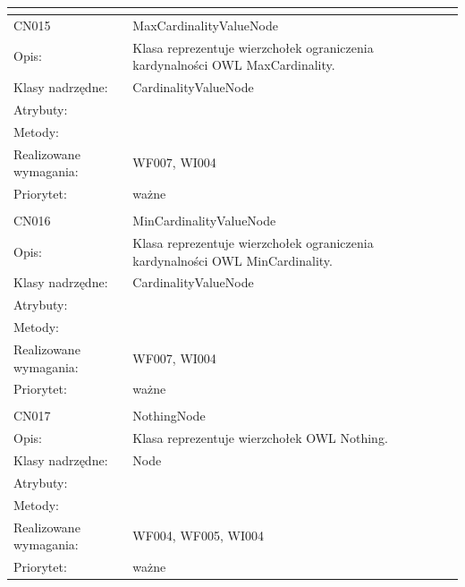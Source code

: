 \begin{center}
\begin{longtable}{|m{3cm}|m{9cm}|}
\multicolumn{2}{c}{} \\
 \hline

CN015 & MaxCardinalityValueNode \\ \hline
Opis: & Klasa reprezentuje wierzchołek ograniczenia kardynalności OWL MaxCardinality.    \\ \hline
Klasy nadrzędne: & CardinalityValueNode     \\ \hline
Atrybuty: & %
 \\ \hline
Metody: & %
  \\ \hline
Realizowane wymagania: & WF007, WI004 \\ \hline
Priorytet: & ważne  \\ \hline

\multicolumn{2}{c}{} \\
 \hline

CN016 & MinCardinalityValueNode \\ \hline
Opis: & Klasa reprezentuje wierzchołek ograniczenia kardynalności OWL MinCardinality.    \\ \hline
Klasy nadrzędne: & CardinalityValueNode     \\ \hline
Atrybuty: & %
 \\ \hline
Metody: & %
  \\ \hline
Realizowane wymagania: & WF007, WI004 \\ \hline
Priorytet: & ważne  \\ \hline

\multicolumn{2}{c}{} \\
 \hline

CN017 & NothingNode \\ \hline
Opis: & Klasa reprezentuje wierzchołek OWL Nothing.    \\ \hline
Klasy nadrzędne: & Node     \\ \hline
Atrybuty: & %
 \\ \hline
Metody: & %
  \\ \hline
Realizowane wymagania: & WF004, WF005, WI004 \\ \hline
Priorytet: & ważne  \\ \hline


\end{longtable}
\end{center}
